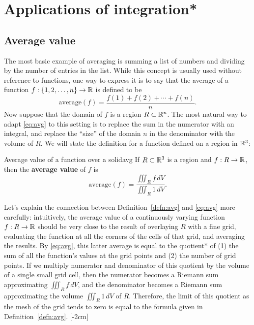 \documentclass[prettycode,shellescape]{watsonbook}
\begin{document}
\section{Applications of integration*} \label{sec:applications}

\subsection{Average value}

The most basic example of averaging is summing a list of numbers and
dividing by the number of entries in the list. While this concept is
usually used without reference to functions, one way to express it is
to say that the average of a function
$f:\{1,2,\ldots,n\} \rightarrow \mathbb{R}$ is defined to be
\begin{equation} \label{eq:avg} 
  \mathrm{average}(f) = \frac{f(1) + f(2) + \cdots + f(n)}{n}. 
\end{equation}
Now suppose that the domain of $f$ is a region $R\subset \mathbb{R}^n$. The
most natural way to adapt \eqref{eq:avg} to this setting is to replace
the sum in the numerator with an integral, and replace the ``size'' of
the domain $n$ in the denominator with the volume of $R$. We will
state the definition for a function defined on a region in $\mathbb{R}^3$:

\begin{defn}{Average value of a function over a solid}{avg}
  If $R\subset \mathbb{R}^3$ is a region and $f: R \to \mathbb{R}$, then the \textbf{average value} of $f$ is
  \[
    \mathrm{average}(f) = \frac{\displaystyle{\iiint_R f \,
        dV}}{\displaystyle{\iiint_R 1 \, dV}}.
  \]
\end{defn}

Let's explain the connection between Definition~\ref{defn:avg} and
\eqref{eq:avg} more carefully: intuitively, the average value of a
continuously varying function $f:R\to \mathbb{R}$ should be very close to the
result of overlaying $R$ with a fine grid, evaluating the function at
all the corners of the cells of that grid, and averaging the
results. By \eqref{eq:avg}, this latter average is equal to the
quotient* of (1) the sum of all the function's values at the grid
points and (2) the number of grid points. If we multiply numerator and
denominator of this quotient by the volume of a single small grid
cell, then the numerator becomes a Riemann sum approximating
$\iiint_R f \, dV$, and the denominator becomes a Riemann sum
approximating the volume $\iiint_R 1 \, dV$ of $R$. Therefore, the
limit of this quotient as the mesh of the grid tends to zero is equal
to the formula given in Definition~\ref{defn:avg}. [-2cm]
\end{document}
